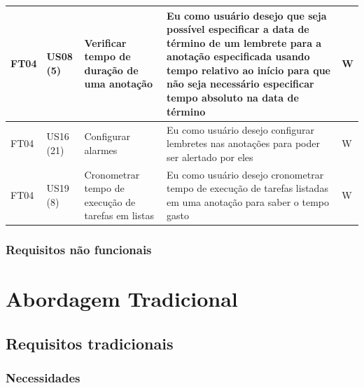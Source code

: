 \documentclass[
	12pt,				%
	oneside,			%
	a4paper,			%
	english,			%
	brazil,				%
	]{abntex2}
\begin{document}
\begin{longtable}{@{}p{}p{}p{}p{}p{}@{}}
FT04 & US08 (5) & Verificar tempo de duração de uma anotação & Eu como usuário desejo que seja possível especificar a data de término de um lembrete para a anotação especificada usando tempo relativo ao início para que não seja necessário especificar tempo absoluto na data de término & W\\ \midrule
FT04 & US16 (21) & Configurar alarmes & Eu como usuário desejo configurar lembretes nas anotações para poder ser alertado por eles & W\\ \midrule
FT04 & US19 (8) & Cronometrar tempo de execução de tarefas em listas & Eu como usuário desejo cronometrar tempo de execução de tarefas listadas em uma anotação para saber o tempo gasto & W\\ \bottomrule
\end{longtable}

\section{Requisitos não funcionais}
\begin{table}[ht]
\end{table}

\part{Abordagem Tradicional}


\chapter{Requisitos tradicionais}
\section{Necessidades}
\end{document}
